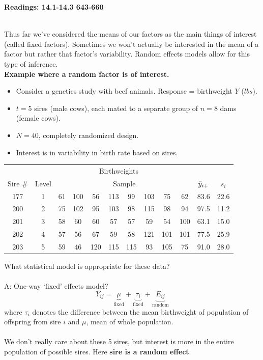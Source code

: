 \begin{center}\large\textbf{Readings: 14.1-14.3 643-660}\\
\normalsize \end{center}
\large \hlinewd{2pt}
~\\
Thus far we've considered the means of our factors as the main things of interest (called fixed factors).  Sometimes we won't actually be interested in the mean of a factor but rather that factor's variability.  Random effects models allow for this type of inference.\\

\textbf{Example where a random factor is of interest.}
\begin{itemize}
\item Consider a genetics study with beef animals.  Response = birthweight $Y$ ($lbs$).
\item $t=5$ sires (male cows), each mated to a separate group of $n=8$ dams (female cows).
\item $N=40$, completely randomized design. 
\item Interest is in variability in birth rate based on sires.
\end{itemize}
\begin{center}
\begin{tabular}{cc|cccccccc|c|c}
\multicolumn{12}{c}{Birthweights} \\
Sire \# & Level & \multicolumn{8}{c|}{Sample} & $\bar{y}_{i +}$ & $s_i$ \\ \hline
177 & 1 & 61 & 100 & 56 & 113 & 99 & 103 & 75 & 62 & 83.6 & 22.6 \\
200 & 2 & 75 & 102 & 95 & 103 & 98 & 115 & 98 & 94 & 97.5 & 11.2\\
201 & 3 & 58 & 60  & 60 & 57 & 57 & 59 & 54 & 100 &  63.1 & 15.0\\
202 & 4 & 57 & 56  & 67 & 59 & 58 & 121 & 101 & 101& 77.5 & 25.9\\
203 & 5 & 59 & 46  & 120 & 115 & 115 & 93 & 105 & 75&91.0 & 28.0 \\ \hline 
\end{tabular}
\end{center}
What statistical model is appropriate for these data?  \\~\\
A: One-way `fixed' effects model?
$$ Y_{ij} = \underbrace{\mu}_{\text{fixed}} + \underbrace{\tau_i}_{\text{fixed}} + \underbrace{E_{ij}}_{\text{random}}$$
where $\tau_i$ denotes the difference between the mean birthweight of population of offspring from sire $i$ and $\mu$, mean of whole population.\\~\\
We don't really care about these 5 sires, but interest is more in the entire population of possible sires.  Here \textbf{sire is a random effect}.

